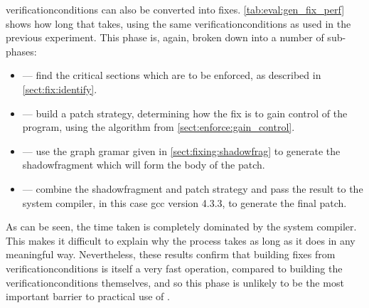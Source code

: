 \Glspl{verificationcondition} can also be converted into fixes.
\autoref{tab:eval:gen_fix_perf} shows how long that takes, using the
same \glspl{verificationcondition} as used in the previous experiment.
This phase is, again, broken down into a number of sub-phases:
\begin{itemize}
\item {} --- find the critical sections which are to be enforced,
  as described in \autoref{sect:fix:identify}.
\item {} --- build a patch strategy, determining how the fix
  is to gain control of the program, using the algorithm from
  \autoref{sect:enforce:gain_control}.
\item {} --- use the graph gramar given in
  \autoref{sect:fixing:shadowfrag} to generate the
  \gls{shadowfragment} which will form the body of the patch.
\item {} --- combine the \gls{shadowfragment} and patch
  strategy and pass the result to the system compiler, in this case gcc
  version 4.3.3, to generate the final patch.
\end{itemize}
As can be seen, the time taken is completely dominated by the system
compiler.  This makes it difficult to explain why the process takes as
long as it does in any meaningful way.  Nevertheless, these results
confirm that building fixes from \glspl{verificationcondition} is
itself a very fast operation, compared to building the
\glspl{verificationcondition} themselves, and so this phase is unlikely
to be the most important barrier to practical use of {\technique}.

